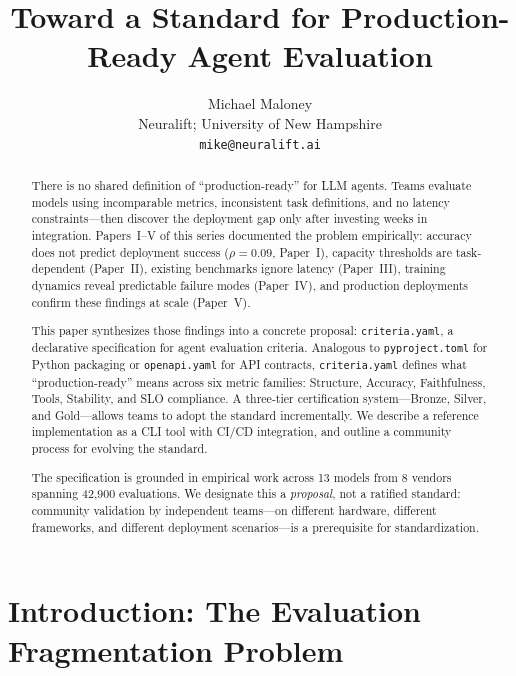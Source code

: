 \documentclass[11pt]{article}
\title{Toward a Standard for Production-Ready Agent Evaluation}
\author{
Michael Maloney \\
Neuralift; University of New Hampshire \\
\texttt{mike@neuralift.ai}
}
\date{}
\newcommand{\criteriayaml}{\texttt{criteria.yaml}}
\begin{document}
\maketitle

\begin{abstract}
There is no shared definition of ``production-ready'' for LLM agents. Teams evaluate models using incomparable metrics, inconsistent task definitions, and no latency constraints---then discover the deployment gap only after investing weeks in integration. Papers~I--V of this series documented the problem empirically: accuracy does not predict deployment success ($\rho = 0.09$, Paper~I), capacity thresholds are task-dependent (Paper~II), existing benchmarks ignore latency (Paper~III), training dynamics reveal predictable failure modes (Paper~IV), and production deployments confirm these findings at scale (Paper~V).

This paper synthesizes those findings into a concrete proposal: \criteriayaml{}, a declarative specification for agent evaluation criteria. Analogous to \texttt{pyproject.toml} for Python packaging or \texttt{openapi.yaml} for API contracts, \criteriayaml{} defines what ``production-ready'' means across six metric families: Structure, Accuracy, Faithfulness, Tools, Stability, and SLO compliance. A three-tier certification system---Bronze, Silver, and Gold---allows teams to adopt the standard incrementally. We describe a reference implementation as a CLI tool with CI/CD integration, and outline a community process for evolving the standard.

The specification is grounded in empirical work across 13 models from 8 vendors spanning 42{,}900 evaluations. We designate this a \emph{proposal}, not a ratified standard: community validation by independent teams---on different hardware, different frameworks, and different deployment scenarios---is a prerequisite for standardization.
\end{abstract}

\section{Introduction: The Evaluation Fragmentation Problem}
\label{sec:introduction}
\end{document}
